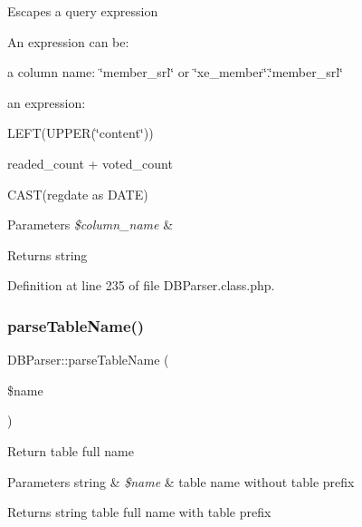 Escapes a query expression

An expression can be\+: ~\newline
 
\begin{DoxyItemize}
\item a column name\+: \char`\"{}member\+\_\+srl\char`\"{} or \char`\"{}xe\+\_\+member\char`\"{}.\char`\"{}member\+\_\+srl\char`\"{} 
\item an expression\+: 
\begin{DoxyItemize}
\item L\+E\+FT(U\+P\+P\+ER(\char`\"{}content\char`\"{})) ~\newline
 
\item readed\+\_\+count + voted\+\_\+count ~\newline
 
\item C\+A\+S\+T(regdate as D\+A\+T\+E)  
\end{DoxyItemize}
\end{DoxyItemize}


\begin{DoxyParams}{Parameters}
{\em \$column\+\_\+name} & \\
\hline
\end{DoxyParams}
\begin{DoxyReturn}{Returns}
string 
\end{DoxyReturn}


Definition at line 235 of file D\+B\+Parser.\+class.\+php.

\mbox{\label{classDBParser_ac4d949f99739a604bd7ee1ca7f14c946}} 
\subsubsection{\texorpdfstring{parse\+Table\+Name()}{parseTableName()}}
{\footnotesize\ttfamily D\+B\+Parser\+::parse\+Table\+Name (\begin{DoxyParamCaption}\item[{}]{\$name }\end{DoxyParamCaption})}

Return table full name


\begin{DoxyParams}[1]{Parameters}
string & {\em \$name} & table name without table prefix\\
\hline
\end{DoxyParams}
\begin{DoxyReturn}{Returns}
string table full name with table prefix 
\end{DoxyReturn}


